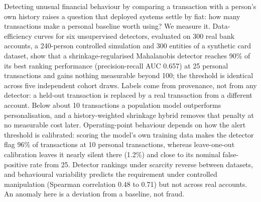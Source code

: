 Detecting unusual financial behaviour by comparing a transaction with a person's own history raises a question that deployed systems settle by fiat: how many transactions make a personal baseline worth using? We measure it. Data-efficiency curves for six unsupervised detectors, evaluated on 300 real bank accounts, a 240-person controlled simulation and 300 entities of a synthetic card dataset, show that a shrinkage-regularised Mahalanobis detector reaches 90\% of its best ranking performance (precision-recall AUC 0.657) at 25 personal transactions and gains nothing measurable beyond 100; the threshold is identical across five independent cohort draws. Labels come from provenance, not from any detector: a held-out transaction is replaced by a real transaction from a different account. Below about 10 transactions a population model outperforms personalisation, and a history-weighted shrinkage hybrid removes that penalty at no measurable cost later. Operating-point behaviour depends on how the alert threshold is calibrated: scoring the model's own training data makes the detector flag 96\% of transactions at 10 personal transactions, whereas leave-one-out calibration leaves it nearly silent there (1.2\%) and close to its nominal false-positive rate from 25. Detector rankings under scarcity reverse between datasets, and behavioural variability predicts the requirement under controlled manipulation (Spearman correlation 0.48 to 0.71) but not across real accounts. An anomaly here is a deviation from a baseline, not fraud.
